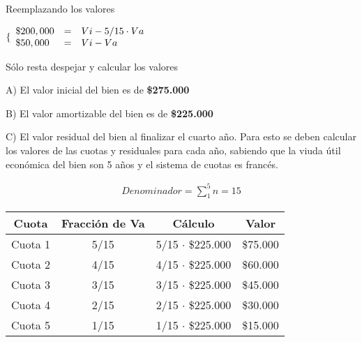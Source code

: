 \documentclass[12pt,a4paper]{article}
\begin{document}
        \par{\hspace{0.5cm}
        	Reemplazando los valores
        	}
        
        \begin{center}
        $
        \lbrace
		\begin{array}{ l c l }
            \$200,000 &=& Vi - 5/15 \cdot Va \\
            \$50,000 &=& Vi - Va
		\end{array}
        $
        \end{center}
        
        \par{\hspace{0.5cm}
        	Sólo resta despejar y calcular los valores
        	}
        
        \hrulefill
        
        A) El valor inicial del bien es de \textbf{\$275.000}
        
        \hrulefill
        
        B) El valor amortizable del bien es de \textbf{\$225.000}
        
        \hrulefill
        
        C) El valor residual del bien al finalizar el cuarto año. Para esto se deben calcular los valores de las cuotas y residuales para cada año, sabiendo que la viuda útil económica del bien son 5 años y el sistema de cuotas es francés.
        
        \begin{align*}
        	Denominador = \sum_{1}^{5} n = 15
		\end{align*}
        
        \newpage
        
        \begin{table}[H]
        \centering
        	\begin{tabular}{ | c | c | c | c | }
            	\hline
                Cuota	&	Fracción de Va	&	Cálculo					&	Valor		\\ \hline
                Cuota 1	&	5/15			&	5/15 $\cdot$ \$225.000	&	\$75.000	\\ \hline
                Cuota 2	&	4/15			&	4/15 $\cdot$ \$225.000	&	\$60.000	\\ \hline
                Cuota 3	&	3/15			&	3/15 $\cdot$ \$225.000	&	\$45.000	\\ \hline
                Cuota 4	&	2/15			&	2/15 $\cdot$ \$225.000	&	\$30.000	\\ \hline
                Cuota 5	&	1/15			&	1/15 $\cdot$ \$225.000	&	\$15.000	\\ \hline
			\end{tabular}
		\end{table}
        
\end{document}
